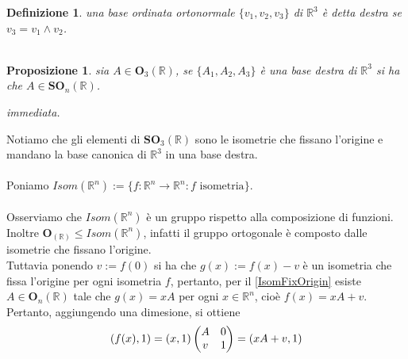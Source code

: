 \documentclass[oneside, 11pt]{amsbook}
\makeatletter
\newcommand{\0}{{(0)}}
\newcommand{\3}{{(3)}}
\theoremstyle{colonplain}
\newtheorem{prop}[thm]{Proposizione}
\theoremstyle{colondefinition}
\newtheorem{defn}[thm]{Definizione}
\theoremstyle{colonremark}
\numberwithin{equation}{chapter}
\renewcommand{\proofname}{Dimostrazione}
\renewenvironment{proof}[1][\proofname]{\par
  \pushQED{\qed}%
  \normalfont \topsep6\p@\@plus6\p@\relax
  \trivlist
  \item[\hskip\labelsep\bfseries #1:]\ignorespaces
}{%
  \popQED\endtrivlist\@endpefalse
}
\makeatother
\begin{document}
\begin{defn} una base ordinata ortonormale $\{ v_1, v_2, v_3 \}$ di $\mathbb{R}^3$ è detta \textit{destra} se $v_3 = v_1 \wedge v_2$. \\ \\
\end{defn}
\begin{prop} sia $A \in \mathbf{O}_3(\mathbb{R})$, se $\{ A_1, A_2, A_3 \}$ è una base destra di $\mathbb{R}^3$ si ha che $A \in \mathbf{SO}_n(\mathbb{R})$. \\

\begin{proof} immediata. \end{proof}
\end{prop}
Notiamo che gli elementi di $\mathbf{SO}_3(\mathbb{R})$ sono le isometrie che fissano l'origine e mandano la base canonica di $\mathbb{R}^3$ in una base destra. \\ \\
Poniamo $Isom(\mathbb{R}^n) := \{ f : \mathbb{R}^n \longrightarrow \mathbb{R}^n : f \text{ isometria} \}$. \\ \\
Osserviamo che $Isom(\mathbb{R}^n)$ è un gruppo rispetto alla composizione di funzioni. Inoltre $\mathbf{O}_(\mathbb{R}) \leq Isom(\mathbb{R}^n)$, infatti il gruppo ortogonale è composto dalle isometrie che fissano l'origine.  \\
Tuttavia ponendo $v := f(0)$ si ha che $g(x) := f(x) - v$ è un isometria che fissa l'origine per ogni isometria $f$, pertanto, per il \cref{IsomFixOrigin} esiste $A \in \mathbf{O}_n(\mathbb{R})$ tale che $g(x) = xA$ per ogni $x \in \mathbb{R}^n$, cioè $f(x) = xA + v$. \\
Pertanto, aggiungendo una dimesione, si ottiene
\begin{align}
    (f(x), 1) = (x, 1) \begin{pmatrix}
        A & 0 \\
        v & 1 
    \end{pmatrix}
    = (xA + v, 1) \notag
\end{align} \\ \\
\end{document}

